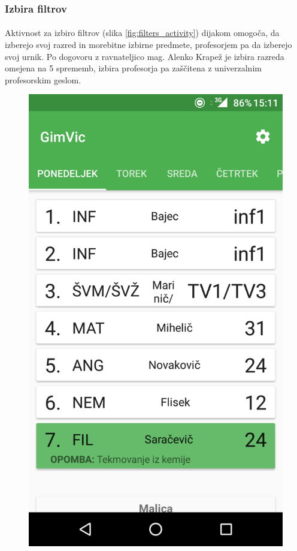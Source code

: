 \subsubsection{Izbira filtrov}
\paragraph{}Aktivnost za izbiro filtrov (slika \ref{fig:filters_activity}) dijakom omogoča, da izberejo svoj razred in morebitne izbirne predmete, profesorjem pa da izberejo svoj urnik. Po dogovoru z ravnateljico mag. Alenko Krapež je izbira razreda omejena na 5 sprememb, izbira profesorja pa zaščitena z univerzalnim profesorskim geslom.

\begin{figure}[!htb]
  \includegraphics[width=\linewidth]{images/main.png}

\end{figure}
